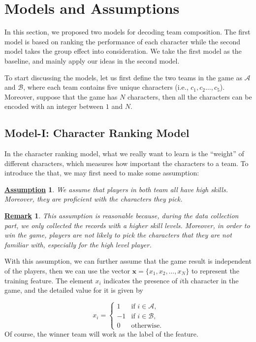 \documentclass[conference]{IEEEtran}
\newtheorem{assumption}{\underline{Assumption}}
\newtheorem{remark}{\underline{Remark}}
\begin{document}
\section{Models and Assumptions}

In this section, we proposed two models for decoding team composition. The first model is based on ranking the performance of each character while the second model takes the group effect into consideration. We take the first model as the baseline, and mainly apply our ideas in the second model.


To start discussing the models,  let us first define the two teams in the game as $\mathcal{A}$ and $\mathcal{B}$, where each team contains five unique characters (i.e., $c_1,c_2\ldots,c_5$). Moreover, suppose that the game has $N$ characters, then all the characters can be encoded with an integer between $1$ and $N$.

\subsection{Model-I: Character Ranking Model}

In the character ranking model, what we really want to learn is the ``weight'' of different characters, which measures how important the characters to a team. To introduce the that, we may first need to make some assumption:

\begin{assumption}
We assume that players in both team all have high skills. Moreover, they are proficient with the characters they pick.
\end{assumption}

\begin{remark}
This assumption is reasonable because, during the data collection part, we only collected the records with a higher skill levels. Moreover, in order to win the game, players are not likely to pick the characters that they are not familiar with, especially for the high level player.
\end{remark}

With this assumption, we can further assume that the game result is independent of the players, then we can use the vector $\textbf{x}=\{x_1,x_2,\ldots,x_N\}$ to represent the training feature. The element $x_i$ indicates the presence of $i$th character in the game, and the detailed value for it is given by

\begin{equation}
x_i =
\begin{cases}
1 &  \text{if $i\in \mathcal{A},$} \\
-1 &  \text{if $i\in \mathcal{B},$} \\
0 & \text{otherwise.}
\end{cases}
\end{equation}
Of course, the winner team will work as the label of the feature.
\end{document}

